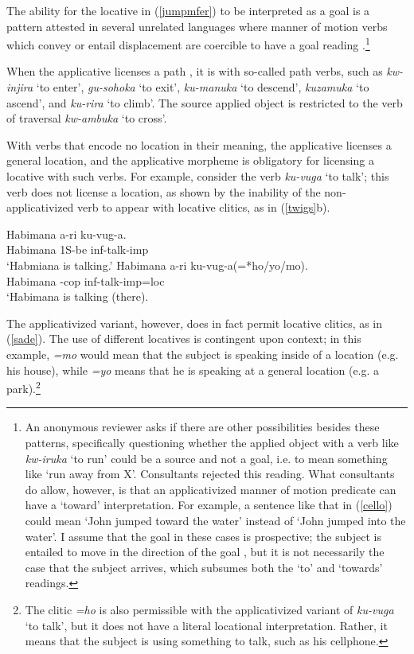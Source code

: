 \documentclass[output=paper]{langsci/langscibook}
\begin{document}
The ability for the locative in (\ref{jumpmfer}) to be interpreted as a {\sc goal}  is a pattern attested in several unrelated languages where manner of motion verbs which convey or entail displacement are coercible to have a {\sc goal}  reading \citep{nikitina:2008,thametal:2012,bassa:2013}.\footnote{An anonymous reviewer asks if there are other possibilities besides these patterns, specifically questioning whether the applied object with a verb like \emph{kw-iruka} `to run' could be a {\sc source} and not a {\sc goal}, i.e. to mean something like `run away from X'. Consultants rejected this reading. What consultants do allow, however, is that an applicativized manner of motion predicate can have a `toward' interpretation. For example, a sentence like that in (\ref{cello}) could mean `John jumped toward the water' instead of `John jumped into the water'. I assume that the {\sc goal}  in these cases is prospective; the subject is entailed to move in the direction of the {\sc goal} , but it is not necessarily the case that the subject arrives, which subsumes both the `to' and `towards' readings.} 
 		
 When the applicative licenses a {\sc path} , it is with so-called path verbs, such as \emph{kw-injira} `to enter', \emph{gu-sohoka} `to exit', \emph{ku-manuka} `to descend', \emph{kuzamuka} `to ascend', and \emph{ku-rira} `to climb'. The {\sc source} applied object is restricted to the verb of traversal \emph{kw-ambuka} `to cross'.


With verbs that encode no location in their meaning, the applicative licenses a general location, and the applicative morpheme is obligatory for licensing a {\sc locative} with such verbs. For example, consider the verb \emph{ku-vuga} `to talk'; this verb does not license a location, as shown by the inability of the non-applicativized verb to appear with locative clitics, as in (\ref{twigs}b). 

\begin{exe}
	\ex\label{twigs}\begin{xlist}
		\ex\gll Habimana a-ri ku-vug-a.\\	
				Habimana 1S-{\sc be} {\sc inf}-talk-{\sc imp}\\
				\glt `Habmiana is talking.'
	\ex\gll Habimana  a-ri ku-vug-a(=*ho/yo/mo).\\
						Habimana {-cop} {\sc inf-}talk-{\sc imp=loc}\\
						\glt `Habimana is talking (there).
\end{xlist}
\end{exe}
%
The applicativized variant, however, does in fact permit locative clitics, as in (\ref{sade}). The use of different locatives is contingent upon context; in this example, \emph{=mo} would mean that the subject is speaking inside of a location (e.g. his house), while \emph{=yo} means that he is speaking at a general location (e.g. a park).\footnote{The clitic \emph{=ho} is also permissible with the applicativized variant of \emph{ku-vuga} `to talk', but it does not have a literal locational interpretation. Rather, it means that the subject is using something to talk, such as his cellphone.}
\end{document}
